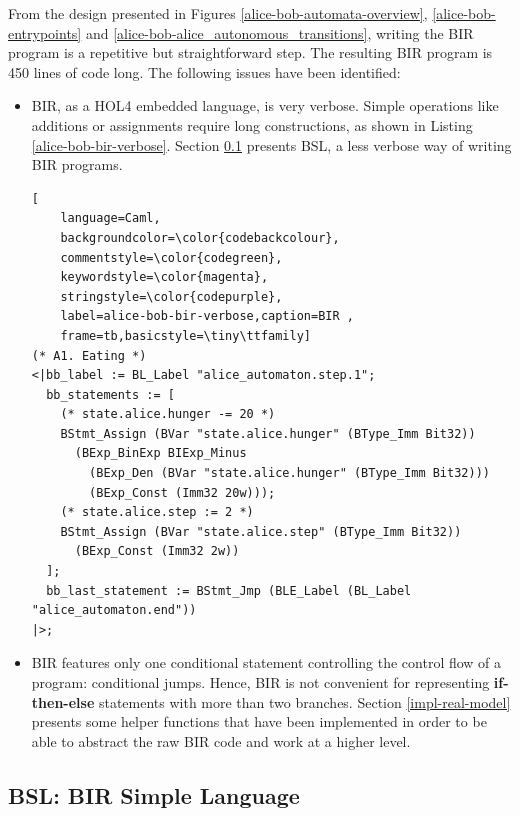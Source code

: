 \documentclass{kththesis}
\begin{document}
{From the design presented in Figures \ref{alice-bob-automata-overview}, \ref{alice-bob-entrypoints} and \ref{alice-bob-alice_autonomous_transitions}, writing the BIR program is a repetitive but straightforward step. The resulting BIR program is \num{450} lines of code long. The following issues have been identified:

\begin{itemize}
    \item BIR, as a HOL4 embedded language, is very verbose. Simple operations like additions or assignments require long constructions, as shown in Listing \ref{alice-bob-bir-verbose}. Section \ref{bsl} presents BSL, a less verbose way of writing BIR programs.
\begin{lstlisting}[
    language=Caml,
    backgroundcolor=\color{codebackcolour},
    commentstyle=\color{codegreen},
    keywordstyle=\color{magenta},
    stringstyle=\color{codepurple},
    label=alice-bob-bir-verbose,caption=BIR ,
    frame=tb,basicstyle=\tiny\ttfamily]
(* A1. Eating *)
<|bb_label := BL_Label "alice_automaton.step.1";
  bb_statements := [
    (* state.alice.hunger -= 20 *)
    BStmt_Assign (BVar "state.alice.hunger" (BType_Imm Bit32))
      (BExp_BinExp BIExp_Minus
        (BExp_Den (BVar "state.alice.hunger" (BType_Imm Bit32)))
        (BExp_Const (Imm32 20w)));
    (* state.alice.step := 2 *)
    BStmt_Assign (BVar "state.alice.step" (BType_Imm Bit32))
      (BExp_Const (Imm32 2w))
  ];
  bb_last_statement := BStmt_Jmp (BLE_Label (BL_Label "alice_automaton.end"))
|>;
\end{lstlisting}
    \item BIR features only one conditional statement controlling the control flow of a program: conditional jumps. Hence, BIR is not convenient for representing \textbf{if-then-else} statements with more than two branches. Section \ref{impl-real-model} presents some helper functions that have been implemented in order to be able to abstract the raw BIR code and work at a higher level.
\end{itemize}

\subsection{BSL: BIR Simple Language} \label{bsl}

}
\end{document}
